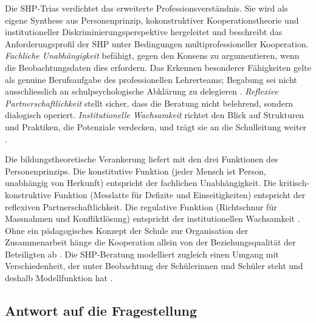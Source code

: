 \documentclass[ngerman, a4paper]{article}
\begin{document}
Die SHP-Trias verdichtet das erweiterte Professionsverständnis. Sie wird als
eigene Synthese aus Personenprinzip, kokonstruktiver Kooperationstheorie und
institutioneller Diskriminierungsperspektive hergeleitet
\parencites[vgl.][S.\,56\psq]{weigand2021person}
[vgl.][S.\,469--471]{groschefussangelgraesel2020kokonstruktion}
[vgl.][S.\,84\psq]{horvath2021elite}
und beschreibt das Anforderungsprofil der SHP unter Bedingungen
multiprofessioneller Kooperation. \textit{Fachliche Unabhängigkeit} befähigt, gegen
den Konsens zu argumentieren, wenn die Beobachtungsdaten dies erfordern. Das
Erkennen besonderer Fähigkeiten gelte als genuine Berufsaufgabe des professionellen
Lehrerteams; Begabung sei nicht ausschliesslich an schulpsychologische Abklärung
zu delegieren
\parencite[vgl.][S.\,342]{reisrenzullimueller2021sem}. \textit{Reflexive
  Partnerschaftlichkeit} stellt sicher, dass die Beratung nicht belehrend, sondern
dialogisch operiert. \textit{Institutionelle Wachsamkeit} richtet den Blick auf
Strukturen und Praktiken, die Potenziale verdecken, und trägt sie an die
Schulleitung weiter \parencite[vgl.][S.\,424]{wagener2021bfhemmendfoerdernd}.

Die bildungstheoretische Verankerung liefert
\textcite[S.\,56\psq]{weigand2021person} mit den drei Funktionen des
Personenprinzips. Die konstitutive Funktion (jeder Mensch ist Person, unabhängig
von Herkunft) entspricht der fachlichen Unabhängigkeit. Die kritisch-konstruktive
Funktion (Messlatte für Defizite und Einseitigkeiten) entspricht der reflexiven
Partnerschaftlichkeit. Die regulative Funktion (Richtschnur für Massnahmen und
Konfliktlösung) entspricht der institutionellen Wachsamkeit
\parencite[vgl.][S.\,56\psq]{weigand2021person}. Ohne ein pädagogisches Konzept
der Schule zur Organisation der Zusammenarbeit hänge die Kooperation allein von der
Beziehungsqualität der Beteiligten ab
\parencite[vgl.][S.\,308]{widmerwolf2018multiprofessionell}. Die
SHP-Beratung modelliert zugleich einen Umgang mit Verschiedenheit, der unter
Beobachtung der Schülerinnen und Schüler steht und deshalb Modellfunktion hat
\parencite[vgl.][S.\,309]{widmerwolf2018multiprofessionell}.

\subsection{Antwort auf die Fragestellung}
\end{document}
